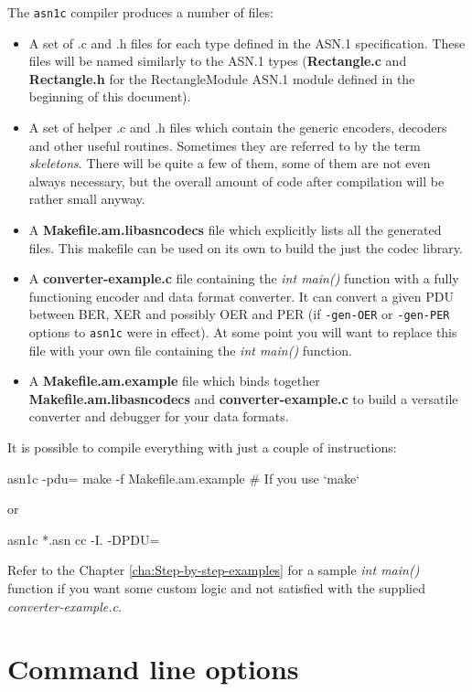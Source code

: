 \documentclass[english,oneside,12pt]{book}
\newcommand{\cmd}[1]{\texttt{#1}}
\begin{document}
The \cmd{asn1c} compiler produces a number of files:
\begin{itemize}
\item A set of .c and .h files for each type defined
in the ASN.1 specification. These files will be named similarly to
the ASN.1 types (\textbf{Rectangle.c} and \textbf{Rectangle.h} for the
RectangleModule ASN.1 module defined in the beginning of this document).
\item A set of helper .c and .h files which contain the generic encoders,
decoders and other useful routines.
Sometimes they are referred to by the term \emph{skeletons}.
There will be quite a few of them, some
of them are not even always necessary, but the overall amount of code
after compilation will be rather small anyway.
\item A \textbf{Makefile.am.libasncodecs} file which explicitly lists all the
generated files.
This makefile can be used on its own to build the just the codec library.
\item A \textbf{converter-example.c} file containing the \emph{int main()} function with a fully functioning encoder and data format converter. It can convert a given PDU between BER, XER and possibly OER and PER (if \cmd{-gen-OER} or \cmd{-gen-PER} options to \cmd{asn1c} were in effect). At some point you will want to replace this file with your own file containing the \emph{int main()} function.
\item A \textbf{Makefile.am.example} file which binds together
\textbf{Makefile.am.libasncodecs} and \textbf{converter-example.c}
to build a versatile converter and debugger for your data formats.
\end{itemize}
It is possible to compile everything with just a couple of instructions:
\begin{bash}
asn1c -pdu=%
make -f Makefile.am.example                   # If you use `make`
\end{bash}
or
\begin{bash}
asn1c *.asn
cc -I. -DPDU=%
\end{bash}
Refer to the Chapter \ref{cha:Step-by-step-examples} for a sample
\emph{int main()} function if you want some custom logic and not satisfied
with the supplied \emph{converter-example.c}.

\clearpage{}
\section{\label{sec:Command-line-options}Command line options}
\end{document}

